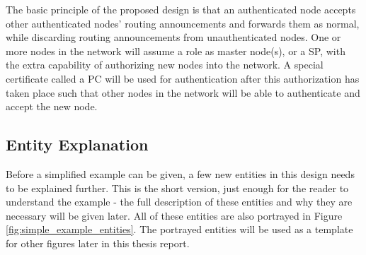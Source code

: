 The basic principle of the proposed design is that an authenticated node accepts
other authenticated nodes' routing announcements and forwards them as normal, while
discarding routing announcements from unauthenticated nodes. One or more nodes in the
network will assume a role as master node(s), or a \ac{SP}, with the extra
capability of authorizing new nodes into the network. A special certificate
called a \ac{PC} \cite{rfc3820} will be used for authentication after this
authorization has taken place such that other nodes in the network will be able
to authenticate and accept the new node.

\subsection{Entity Explanation}
Before a simplified example can be given, a few new entities in this design
needs to be explained further. This is the short version, just enough for the
reader to understand the example - the full description of these entities
and why they are necessary will be given later. All of these entities are also
portrayed in Figure \ref{fig:simple_example_entities}. The portrayed entities
will be used as a template for other figures later in this thesis report.


